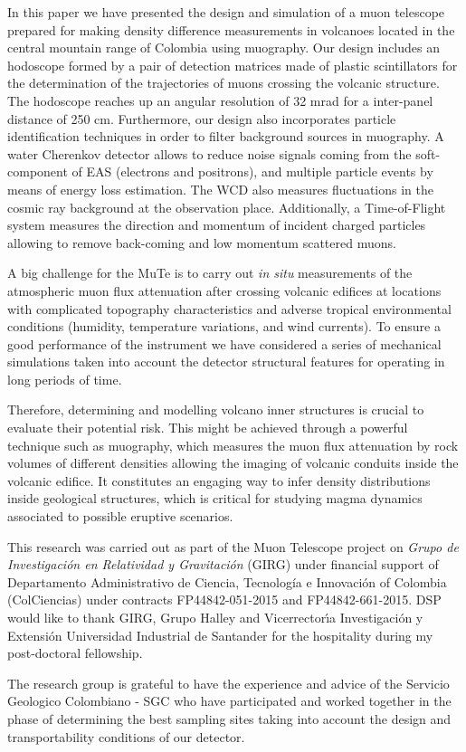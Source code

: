 \documentclass[letterpaper,11pt]{article}
\begin{document}
In this paper we have presented the design and simulation of a muon telescope prepared for making density difference measurements in volcanoes located in the central mountain range of Colombia using muography. Our design includes an hodoscope formed by a pair of detection matrices made of plastic scintillators for the determination of the trajectories of muons crossing the volcanic structure. The hodoscope reaches up an angular resolution of 32 mrad for a inter-panel distance of 250 cm. Furthermore, our design also incorporates particle identification techniques in order to filter background sources in muography. A water Cherenkov detector allows to reduce noise signals coming from the soft-component of EAS (electrons and positrons), and multiple particle events by means of energy loss estimation. The WCD also measures fluctuations in the cosmic ray background at the observation place. Additionally, a Time-of-Flight system measures the direction and momentum of incident charged particles allowing to remove back-coming and low momentum scattered muons.

A big challenge for the MuTe is to carry out {\it in situ} measurements of the atmospheric muon flux attenuation after crossing volcanic edifices at locations with complicated topography characteristics and adverse tropical environmental conditions (humidity, temperature variations, and wind currents). To ensure a good performance of the instrument we have considered a series of mechanical simulations taken into account the detector structural features for operating in long periods of time. 

Therefore, determining and modelling volcano inner structures is crucial to evaluate their potential risk. This might be achieved through a powerful technique such as muography, which measures the muon flux attenuation by rock volumes of different densities allowing the imaging of volcanic conduits inside the volcanic edifice. It constitutes an engaging way to infer density distributions inside geological structures, which is critical for studying magma dynamics associated to possible eruptive scenarios. 

\acknowledgments

This research was carried out as part of the Muon Telescope project on {\it Grupo de Investigaci\'on en Relatividad y Gravitaci\'on} (GIRG) under financial support of  Departamento Administrativo de Ciencia, Tecnolog\'ia e Innovaci\'on of Colombia (ColCiencias) under contracts FP44842-051-2015 and FP44842-661-2015. DSP would like to thank GIRG, Grupo Halley and Vicerrector\'{\i}a Investigaci\'on y Extensi\'on Universidad Industrial de Santander for the hospitality during my post-doctoral fellowship.

The research group is grateful to have the experience and advice of the Servicio Geologico Colombiano - SGC who have participated and worked together in the phase of determining the best sampling sites taking into account the design and transportability conditions of our detector.




\end{document}
